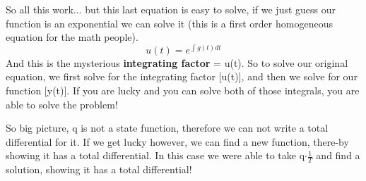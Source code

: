 \documentclass{article}
\begin{document}
So all this work... but this last equation is easy to solve, if  we just guess our function is an exponential we can solve it (this is a first order homogeneous equation for the math people). 
\begin{equation}
u(t) = e^{\int g(t)dt}
\end{equation}
And this is the mysterious \textbf{integrating factor} = u(t).
So to solve our original equation, we first solve for the integrating factor [u(t)], and then we solve for our function  [y(t)].
If you are lucky and you can solve both of those integrals, you are able to solve the problem!

So big picture, q is not a state function, therefore we can not write a total differential for it. 
If we get lucky however, we can find a new function, there-by showing it has a total differential.
In this case we were able to take q$\cdot \frac{1}{T}$ and find a solution, showing it has a total differential! 
\end{document}
